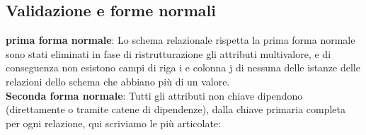 \documentclass[11pt]{article}
\begin{document}
\subsection{Validazione e forme normali}

\textbf{prima forma normale}: Lo schema relazionale rispetta la prima forma normale sono stati eliminati in fase di ristrutturazione gli attributi multivalore, 
e di conseguenza non esistono campi di riga i e colonna j di nessuna delle istanze delle relazioni dello schema che abbiano più di un valore.\\

\textbf{Seconda forma normale}: Tutti gli attributi non chiave dipendono (direttamente o tramite catene di dipendenze), dalla chiave primaria completa per ogni relazione, qui scriviamo le più articolate:
\end{document}
